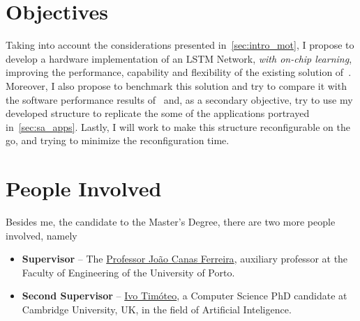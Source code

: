 \section{Objectives}\label{sec:intro_obj}
Taking into account the considerations presented in~\ref{sec:intro_mot}, I propose to develop a hardware implementation of an LSTM Network, \emph{with on-chip learning}, improving the performance, capability and flexibility of the existing solution of~\cite{Chang15}. Moreover, I also propose to benchmark this solution and try to compare it with the software performance results of~\cite{Tavear13} and, as a secondary objective, try to use my developed structure to replicate the some of the applications portrayed in~\ref{sec:sa_apps}. Lastly, I will work to make this structure reconfigurable on the go, and trying to minimize the reconfiguration time.

\section{People Involved}\label{sec:intro_people}
Besides me, the candidate to the Master's Degree, there are two more people involved, namely

\begin{itemize}
    \item \textbf{Supervisor} -- The \href{https://sigarra.up.pt/feup/pt/func\_geral.formview?p\_codigo=210963}{Professor João Canas Ferreira}, auxiliary professor at the Faculty of Engineering of the University of Porto.
    \item \textbf{Second Supervisor} -- \href{http://www.cl.cam.ac.uk/~ijpdmt2/}{Ivo Timóteo}, a Computer Science PhD candidate at Cambridge University, UK, in the field of Artificial Inteligence.
\end{itemize}

